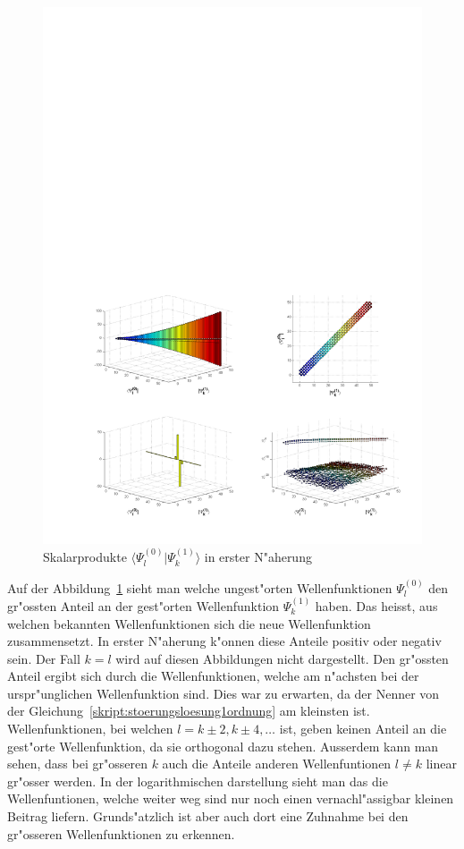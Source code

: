 \begin{refsection}
\begin{figure}	%
\centering
\includegraphics[width=1.0\textwidth]{anharmonisch/images/x3/Stoerung1Skalare.pdf}
\caption{Skalarprodukte $\langle\Psi_l^{(0)}|\Psi_k^{(1)}\rangle$ in erster N"aherung
\label{skript:x3_Stoerung1Skalare}}
\end{figure}

Auf der Abbildung~\ref{skript:x3_Stoerung1Skalare} sieht man welche ungest"orten Wellenfunktionen $\Psi_l^{(0)}$ den gr"ossten Anteil an der gest"orten Wellenfunktion $\Psi_k^{(1)}$ haben. Das heisst, aus welchen bekannten Wellenfunktionen sich die neue Wellenfunktion zusammensetzt. In erster N"aherung k"onnen diese Anteile positiv oder negativ sein. Der Fall $k=l$ wird auf diesen Abbildungen nicht dargestellt. Den gr"ossten Anteil ergibt sich durch die Wellenfunktionen, welche am n"achsten bei der urspr"unglichen Wellenfunktion sind. Dies war zu erwarten, da der Nenner von der Gleichung~\ref{skript:stoerungsloesung1ordnung} am kleinsten ist. Wellenfunktionen, bei welchen $l=k\pm 2,k\pm 4,\dots$ ist, geben keinen Anteil an die gest"orte Wellenfunktion, da sie orthogonal dazu stehen. Ausserdem kann man sehen, dass bei gr"osseren $k$ auch die Anteile anderen Wellenfuntionen $l\neq k$ linear gr"osser werden. In der logarithmischen darstellung sieht man das die Wellenfuntionen, welche weiter weg sind nur noch einen vernachl"assigbar kleinen Beitrag liefern. Grunds"atzlich ist aber auch dort eine Zuhnahme bei den gr"osseren Wellenfunktionen zu erkennen.



\end{refsection}
